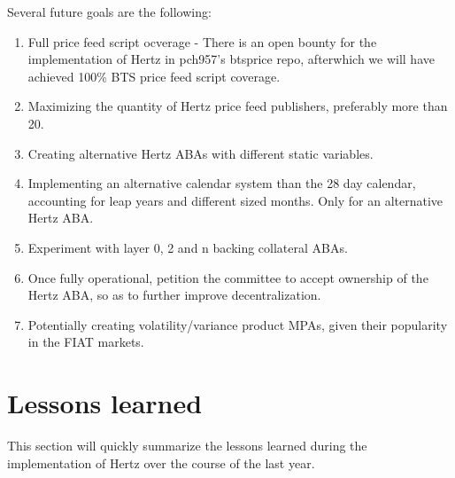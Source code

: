 \documentclass[sigconf]{acmart}
\begin{document}
Several future goals are the following:

\begin{enumerate}[wide, labelwidth=!, labelindent=0pt]
\item Full price feed script ocverage - There is an open bounty for the implementation of Hertz in pch957's btsprice repo, afterwhich we will have achieved 100\% BTS price feed script coverage.
\item Maximizing the quantity of Hertz price feed publishers, preferably more than 20.
\item Creating alternative Hertz ABAs with different static variables.
\item Implementing an alternative calendar system than the 28 day calendar, accounting for leap years and different sized months. Only for an alternative Hertz ABA.
\item Experiment with layer 0, 2 and n backing collateral ABAs.
\item Once fully operational, petition the committee to accept ownership of the Hertz ABA, so as to further improve decentralization.
\item Potentially creating volatility/variance product MPAs, given their popularity in the FIAT markets.
\end{enumerate}

\newpage

\section{Lessons learned}

This section will quickly summarize the lessons learned during the implementation of Hertz over the course of the last year.

\smallskip
\end{document}
